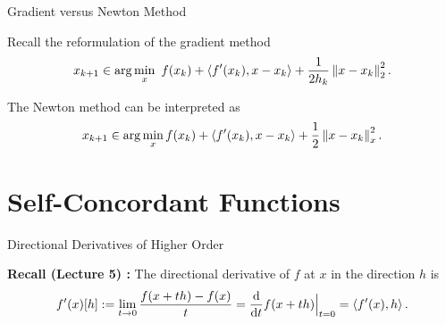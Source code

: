 \documentclass[9pt]{beamer}
\begin{document}
\begin{frame}{Gradient versus Newton Method}

  Recall the reformulation of the gradient method
  \[
    x_{k+1 } \in \arg \min_{x} ~f(x_k) + \left<f'(x_k), x-x_k\right> + \frac{1}{2 h_k} \left\|x - x_k\right\|^2_2. 
  \]

  \vfill

  The Newton method can be interpreted as
  \[
    x_{k+1 } \in \arg \min_{x} f(x_k) + \left<f'(x_k), x-x_k\right> + \frac{1}{2} \left\|x-x_k\right\|^2_x.
  \]
  
\end{frame}


\section{Self-Concordant Functions}

\begin{frame}{Directional Derivatives of Higher Order}

  \textbf{Recall (Lecture 5) :} The directional derivative of $f$ at $x$ in the direction $h$ is
  \[
    f'(x)[h] := \lim_{t\to 0}\frac{f(x+th)-f(x)}{t} = \frac{{\mathrm{d}}}{{\mathrm{d}} t} f(x+th)\Big|_{t=0} = \left<f'(x), h\right>.
  \]

  \vfill


  \vfill


\end{frame}
\end{document}
